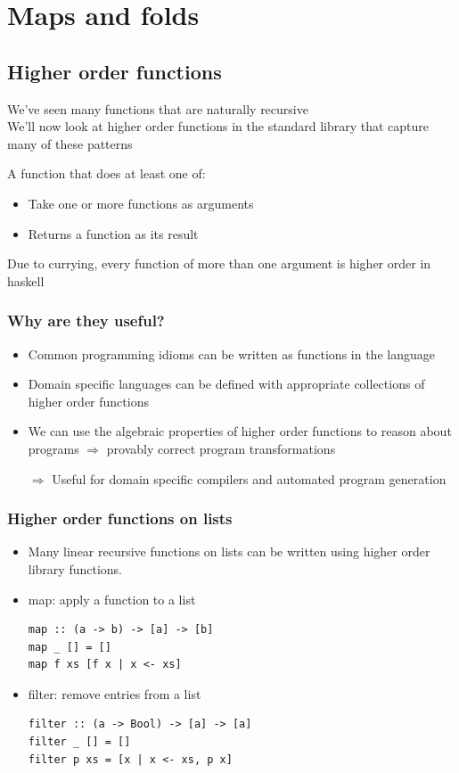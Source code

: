 \documentclass{article}[18pt]
\begin{document}
\section{Maps and folds}
\subsection{Higher order functions}
We've seen many functions that are naturally recursive\\
We'll now look at higher order functions in the standard library that capture many of these patterns
\begin{defin}
A function that does at least one of:
\begin{itemize}
	\item Take one or more functions as arguments
	\item Returns a function as its result
\end{itemize}
\end{defin}
Due to currying, every function of more than one argument is higher order in haskell
\subsubsection{Why are they useful?}
\begin{itemize}
	\item Common programming idioms can be written as functions in the language
	\item Domain specific languages can be defined with appropriate collections of higher order functions
	\item We can use the algebraic properties of higher order functions to reason about programs $\Rightarrow$ provably correct program transformations
	\item [$\Rightarrow$] Useful for domain specific compilers and automated program generation
\end{itemize}
\subsubsection{Higher order functions on lists}
\begin{itemize}
	\item Many linear recursive functions on lists can be written using higher order library functions.
	\item map: apply a function to a list
\begin{verbatim}
map :: (a -> b) -> [a] -> [b]
map _ [] = []
map f xs [f x | x <- xs]
\end{verbatim}
	\item filter: remove entries from a list
\begin{verbatim}
filter :: (a -> Bool) -> [a] -> [a]
filter _ [] = []
filter p xs = [x | x <- xs, p x]
\end{verbatim}
\end{itemize}
\end{document}
